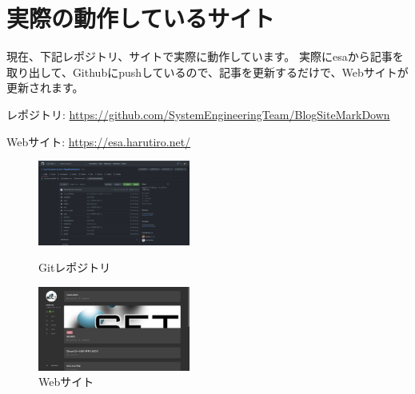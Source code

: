 \chapter{実際の動作しているサイト}

現在、下記レポジトリ、サイトで実際に動作しています。
実際にesaから記事を取り出して、Githubにpushしているので、記事を更新するだけで、Webサイトが更新されます。


レポジトリ:
\url{https://github.com/SystemEngineeringTeam/BlogSiteMarkDown}

Webサイト:
\url{https://esa.harutiro.net/}

\begin{figure}[htbp]
  \begin{minipage}{0.5\hsize}
      \begin{center}
          \includegraphics[width=50mm]{./image/02-chap2/git-repo.png}
      \end{center}
      \caption{Gitレポジトリ}
      \label{chap2-git-repo}
  \end{minipage}
  \begin{minipage}{0.5\hsize}
      \begin{center}
          \includegraphics[width=50mm]{./image/02-chap2/sysken-web.png}
      \end{center}
      \caption{Webサイト}
      \label{chap2-web-site}
  \end{minipage}
\end{figure}